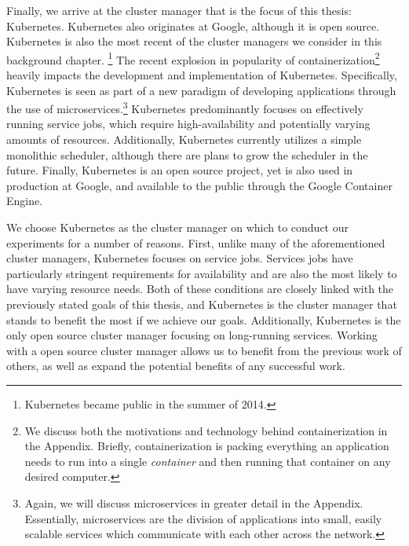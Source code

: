 Finally, we arrive at the cluster manager that is the focus of this thesis:
Kubernetes. Kubernetes also originates at Google, although it is open source.
Kubernetes is also the most
recent of the cluster managers we consider in this background chapter.
\footnote{Kubernetes became public in the summer of 2014.} The recent
explosion in popularity of containerization\footnote{We discuss both the motivations and
technology behind containerization in the Appendix. Briefly, containerization is
packing everything an application needs to run into a single \textit{container}
and then running that container on any desired computer.}
heavily impacts the development and implementation of Kubernetes. Specifically,
Kubernetes is seen as part of a new paradigm of developing applications
through the use of microservices.\footnote{Again, we will
discuss microservices in greater detail
in the Appendix. Essentially, microservices are the division of applications
into small, easily scalable services which communicate with each other across
the network.} Kubernetes predominantly focuses on effectively running service
jobs, which require high-availability and potentially varying amounts of resources.
Additionally, Kubernetes currently utilizes a simple
monolithic scheduler, although
there are plans to grow the scheduler in the future.\cite{k8s-design-overview}
Finally, Kubernetes is an open source project, yet is also used in production at
Google, and available to the public through the Google Container
Engine.\cite{google-container-engine}

We choose Kubernetes as the cluster manager on which to conduct our experiments
for a number of reasons. First, unlike many of the aforementioned cluster
managers, Kubernetes focuses on service jobs. Services jobs
have particularly stringent requirements for availability and are also the most
likely to have varying resource needs. Both of these conditions are closely linked
with the previously stated goals of this thesis, and Kubernetes is the cluster
manager that stands to benefit the most if we achieve our goals. Additionally,
Kubernetes is the only open source cluster manager focusing on long-running
services. Working with a open source cluster manager allows us to benefit from
the previous work of others, as well as expand the potential benefits of any
successful work.
